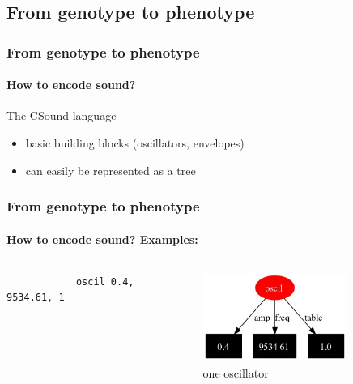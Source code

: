 \documentclass{beamer}
\begin{document}

\subsection{From genotype to phenotype} %
\label{sg:sub:from_genotype_to_phenotype}

\begin{frame}
	\frametitle{From genotype to phenotype}
	\framesubtitle{How to encode sound?}
	
	The CSound language

	\begin{itemize}
		\item<1-> basic building blocks (oscillators, envelopes)
		\item<2-> can easily be represented as a tree
	\end{itemize}
\end{frame}


\begin{frame}[fragile]
	\frametitle{From genotype to phenotype}
	\framesubtitle{How to encode sound? Examples:}
	
	\begin{columns}[t] 
		\begin{lstlisting}
			oscil 0.4, 9534.61, 1
		\end{lstlisting}
		
		\begin{figure}[h]
			\centering
				\includegraphics[width=0.8\textwidth]{images/one_oscil.jpg}
			\caption{one oscillator}
			\label{sg:fig:images_one_oscil}
		\end{figure}
	\end{columns}
\end{frame}
\end{document}
